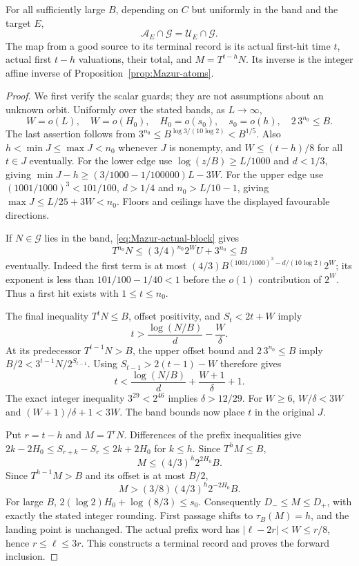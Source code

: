 \begin{proposition}
\label{prop:Mazur-genuine-coverage}
For all sufficiently large $B$, depending on $C$ but uniformly in
the band and the target $E$,
\begin{equation}
 \mathcal A_E\cap\mathcal G=\mathcal U_E\cap\mathcal G.
 \label{eq:Mazur-genuine-coverage}
\end{equation}
The map from a good source to its terminal record is its actual first-hit
time $t$, actual first $t-h$ valuations, their total, and $M=T^{t-h}N$.
Its inverse is the integer affine inverse of
Proposition~\ref{prop:Mazur-atoms}.
\end{proposition}
\begin{proof}
We first verify the scalar guards; they are not assumptions about an
unknown orbit. Uniformly over the stated bands, as $L\to\infty$,
\[
 W=o(L),\quad W=o(H_0),\quad H_0=o(s_0),\quad s_0=o(h),\quad
 2\,3^{n_0}\le B.
\]
The last assertion follows from
$3^{n_0}\le B^{\log3/(10\log2)}<B^{1/5}$.
Also $h<\min J\le\max J<n_0$ whenever $J$ is nonempty, and
$W\le(t-h)/8$ for all $t\in J$ eventually.
For the lower edge use
$\log(z/B)\ge L/1000$ and $d<1/3$, giving
$\min J-h\ge(3/1000-1/100000)L-3W$.
For the upper edge use $(1001/1000)^3<101/100$, $d>1/4$ and
$n_0>L/10-1$, giving $\max J\le L/25+3W<n_0$.
Floors and ceilings have the displayed favourable directions.

If $N\in\mathcal G$ lies in the band, \eqref{eq:Mazur-actual-block} gives
\[
 T^{n_0}N\le(3/4)^{n_0}2^W U+3^{n_0}\le B
\]
eventually. Indeed the first term is at most
$(4/3)B^{(1001/1000)^3-d/(10\log2)}2^W$;
its exponent is less than $101/100-1/40<1$ before the $o(1)$
contribution of $2^W$. Thus a first hit exists with $1\le t\le n_0$.

The final inequality $T^tN\le B$, offset positivity, and
$S_t<2t+W$ imply
\[
 t>\frac{\log(N/B)}d-\frac W\delta.
\]
At its predecessor $T^{t-1}N>B$, the upper offset bound and
$2\,3^{n_0}\le B$ imply
$B/2<3^{t-1}N/2^{S_{t-1}}$.
Using $S_{t-1}>2(t-1)-W$ therefore gives
\[
 t<\frac{\log(N/B)}d+\frac{W+1}{\delta}+1.
\]
The exact integer inequality $3^{29}<2^{46}$ implies
$\delta>12/29$. For $W\ge6$,
$W/\delta<3W$ and $(W+1)/\delta+1<3W$.
The band bounds now place $t$ in the original $J$.

Put $r=t-h$ and $M=T^rN$.
Differences of the prefix inequalities give
$2k-2H_0\le S_{r+k}-S_r\le2k+2H_0$ for $k\le h$.
Since $T^hM\le B$,
\[
 M\le(4/3)^h2^{2H_0}B.
\]
Since $T^{h-1}M>B$ and its offset is at most $B/2$,
\[
 M>(3/8)(4/3)^h2^{-2H_0}B.
\]
For large $B$, $2(\log2)H_0+\log(8/3)\le s_0$.
Consequently $D_-\le M\le D_+$, with exactly the stated integer
rounding. First passage shifts to $\tau_B(M)=h$, and the landing
point is unchanged. The actual prefix word has
$|\ell-2r|<W\le r/8$, hence $r\le\ell\le3r$.
This constructs a terminal record and proves the forward inclusion.


\end{proof}
